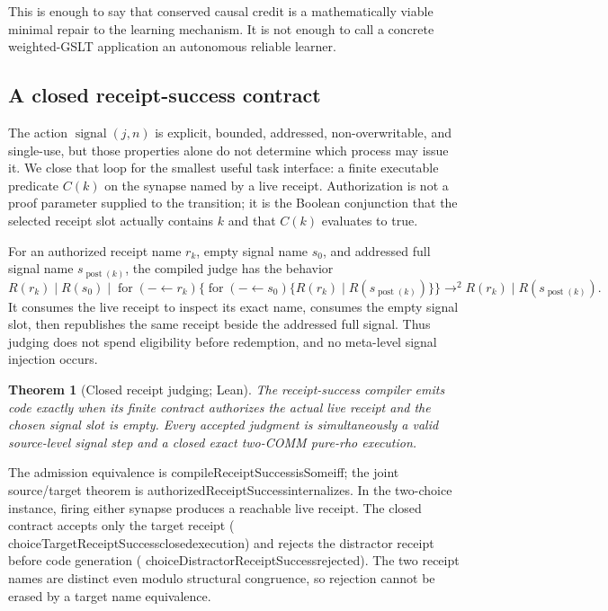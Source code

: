 \documentclass[11pt]{article}
\newtheorem{theorem}{Theorem}[section]
\newcommand{\GSLT}{\textup{GSLT}}
\newcommand{\post}{\operatorname{post}}
\newcommand{\leanname}[1]{{\scriptsize\ttfamily
  \def\_{\textunderscore\allowbreak}#1}}
\begin{document}
This is enough to say that conserved causal credit is a mathematically viable
minimal repair to the learning mechanism.  It is not enough to call a concrete
weighted-\GSLT{} application an autonomous reliable learner.

\subsection{A closed receipt-success contract}

The action $\operatorname{signal}(j,n)$ is explicit, bounded, addressed,
non-overwritable, and single-use, but those properties alone do not determine
which process may issue it.  We close that loop for the smallest useful task
interface: a finite executable predicate $C(k)$ on the synapse named by a live
receipt.  Authorization is not a proof parameter supplied to the transition;
it is the Boolean conjunction that the selected receipt slot actually
contains $k$ and that $C(k)$ evaluates to true.

For an authorized receipt name $r_k$, empty signal name $s_0$, and addressed
full signal name $s_{\post(k)}$, the compiled judge has the behavior
\[
  R(r_k)\mid R(s_0)\mid
  \operatorname{for}({-}\leftarrow r_k)
  \{\operatorname{for}({-}\leftarrow s_0)
  \{R(r_k)\mid R(s_{\post(k)})\}\}
  \longrightarrow^2
  R(r_k)\mid R(s_{\post(k)}).
\]
It consumes the live receipt to inspect its exact name, consumes the empty
signal slot, then republishes the same receipt beside the addressed full
signal.  Thus judging does not spend eligibility before redemption, and no
meta-level signal injection occurs.

\begin{theorem}[Closed receipt judging; Lean]
The receipt-success compiler emits code exactly when its finite contract
authorizes the actual live receipt and the chosen signal slot is empty.  Every
accepted judgment is simultaneously a valid source-level signal step and a
closed exact two-COMM pure-rho execution.
\end{theorem}

The admission equivalence is
\leanname{compileReceiptSuccess\_isSome\_iff}; the joint source/target theorem
is \leanname{authorizedReceiptSuccess\_internalizes}.  In the two-choice
instance, firing either synapse produces a reachable live receipt.  The closed
contract accepts only the target receipt
(\leanname{choiceTargetReceiptSuccess\_closed\_execution}) and rejects the
distractor receipt before code generation
(\leanname{choiceDistractorReceiptSuccess\_rejected}).  The two receipt names
are distinct even modulo structural congruence, so rejection cannot be erased
by a target name equivalence.
\end{document}
